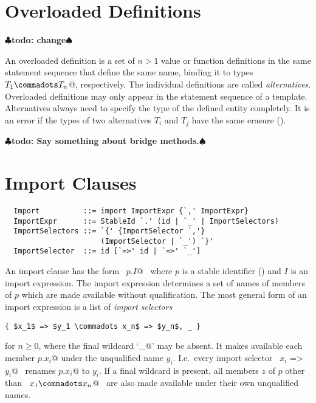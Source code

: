 \documentclass[a4paper,12pt,twoside,titlepage]{book}
\renewcommand{\todo}[1]{{$\clubsuit$\bf todo: #1$\spadesuit$}}
\begin{document}
\section{Overloaded Definitions}
\label{sec:overloaded-defs}
\todo{change}

An overloaded definition is a set of $n > 1$ value or function
definitions in the same statement sequence that define the same name,
binding it to types ~\lstinline@$T_1 \commadots T_n$@, respectively.
The individual definitions are called {\em alternatives}.  Overloaded
definitions may only appear in the statement sequence of a template.
Alternatives always need to specify the type of the defined entity
completely.  It is an error if the types of two alternatives $T_i$ and
$T_j$ have the same erasure ().

\todo{Say something about bridge methods.}

\section{Import Clauses}
\label{sec:import}

\syntax\begin{lstlisting}
  Import          ::= import ImportExpr {`,' ImportExpr}
  ImportExpr      ::= StableId `.' (id | `_' | ImportSelectors)
  ImportSelectors ::= `{' {ImportSelector `,'} 
                      (ImportSelector | `_') `}'
  ImportSelector  ::= id [`=>' id | `=>' `_']
\end{lstlisting}

An import clause has the form ~\lstinline@import $p$.$I$@~ where $p$ is a stable
identifier () and $I$ is an import expression.
The import expression determines a set of names of members of $p$
which are made available without qualification. The most general form
of an import expression is a list of {\em import selectors}
\begin{lstlisting}
{ $x_1$ => $y_1 \commadots x_n$ => $y_n$, _ }
\end{lstlisting}
for $n \geq 0$, where the final wildcard `\lstinline@_@' may be absent.  It
makes available each member \lstinline@$p$.$x_i$@ under the unqualified name
$y_i$. I.e.\ every import selector ~\lstinline@$x_i$ => $y_i$@~ renames
\lstinline@$p$.$x_i$@ to
$y_i$.  If a final wildcard is present, all members $z$ of
$p$ other than ~\lstinline@$x_1 \commadots x_n$@~ are also made available
under their own unqualified names.
\end{document}
